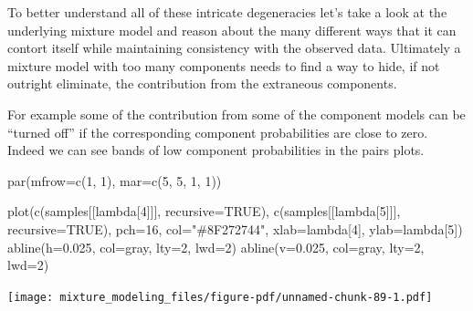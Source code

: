 \documentclass[
  letterpaper,
  DIV=11,
  numbers=noendperiod]{scrartcl}
\newenvironment{Shaded}{\begin{snugshade}}{\end{snugshade}}
\newcommand{\AttributeTok}[1]{\textcolor[rgb]{0.40,0.45,0.13}{#1}}
\newcommand{\ConstantTok}[1]{\textcolor[rgb]{0.56,0.35,0.01}{#1}}
\newcommand{\DecValTok}[1]{\textcolor[rgb]{0.68,0.00,0.00}{#1}}
\newcommand{\FloatTok}[1]{\textcolor[rgb]{0.68,0.00,0.00}{#1}}
\newcommand{\FunctionTok}[1]{\textcolor[rgb]{0.28,0.35,0.67}{#1}}
\newcommand{\NormalTok}[1]{\textcolor[rgb]{0.00,0.23,0.31}{#1}}
\newcommand{\StringTok}[1]{\textcolor[rgb]{0.13,0.47,0.30}{#1}}
\begin{document}
To better understand all of these intricate degeneracies let's take a
look at the underlying mixture model and reason about the many different
ways that it can contort itself while maintaining consistency with the
observed data. Ultimately a mixture model with too many components needs
to find a way to hide, if not outright eliminate, the contribution from
the extraneous components.

For example some of the contribution from some of the component models
can be ``turned off'' if the corresponding component probabilities are
close to zero. Indeed we can see bands of low component probabilities in
the pairs plots.

\begin{Shaded}
\begin{Highlighting}[]
\FunctionTok{par}\NormalTok{(}\AttributeTok{mfrow=}\FunctionTok{c}\NormalTok{(}\DecValTok{1}\NormalTok{, }\DecValTok{1}\NormalTok{), }\AttributeTok{mar=}\FunctionTok{c}\NormalTok{(}\DecValTok{5}\NormalTok{, }\DecValTok{5}\NormalTok{, }\DecValTok{1}\NormalTok{, }\DecValTok{1}\NormalTok{))}

\FunctionTok{plot}\NormalTok{(}\FunctionTok{c}\NormalTok{(samples[[}\StringTok{\textquotesingle{}lambda[4]\textquotesingle{}}\NormalTok{]], }\AttributeTok{recursive=}\ConstantTok{TRUE}\NormalTok{),}
     \FunctionTok{c}\NormalTok{(samples[[}\StringTok{\textquotesingle{}lambda[5]\textquotesingle{}}\NormalTok{]], }\AttributeTok{recursive=}\ConstantTok{TRUE}\NormalTok{),}
     \AttributeTok{pch=}\DecValTok{16}\NormalTok{, }\AttributeTok{col=}\StringTok{"\#8F272744"}\NormalTok{,}
     \AttributeTok{xlab=}\StringTok{\textquotesingle{}lambda[4]\textquotesingle{}}\NormalTok{, }\AttributeTok{ylab=}\StringTok{\textquotesingle{}lambda[5]\textquotesingle{}}\NormalTok{)}
\FunctionTok{abline}\NormalTok{(}\AttributeTok{h=}\FloatTok{0.025}\NormalTok{, }\AttributeTok{col=}\StringTok{\textquotesingle{}gray\textquotesingle{}}\NormalTok{, }\AttributeTok{lty=}\DecValTok{2}\NormalTok{, }\AttributeTok{lwd=}\DecValTok{2}\NormalTok{)}
\FunctionTok{abline}\NormalTok{(}\AttributeTok{v=}\FloatTok{0.025}\NormalTok{, }\AttributeTok{col=}\StringTok{\textquotesingle{}gray\textquotesingle{}}\NormalTok{, }\AttributeTok{lty=}\DecValTok{2}\NormalTok{, }\AttributeTok{lwd=}\DecValTok{2}\NormalTok{)}
\end{Highlighting}
\end{Shaded}

\texttt{[image: mixture\_modeling\_files/figure-pdf/unnamed-chunk-89-1.pdf]}
\end{document}
